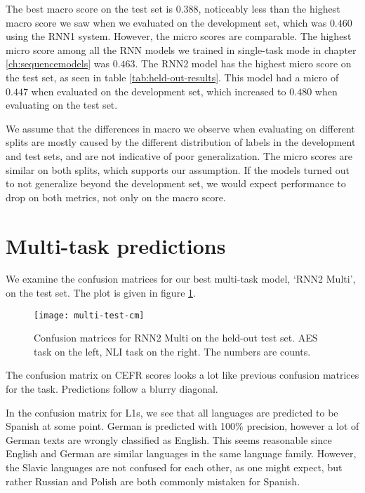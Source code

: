 The best macro \FI score on the test set is $0.388$, noticeably less than the
highest macro \FI score we saw when we evaluated on the development set,
which was $0.460$ using the RNN1 system. However, the micro \FI scores are
comparable. The highest micro \FI score among all the RNN models we trained
in single-task mode in chapter \ref{ch:sequencemodels} was $0.463$. The RNN2
model has the highest micro \FI score on the test set, as seen in table
\ref{tab:held-out-results}. This model had a micro \FI of $0.447$ when
evaluated on the development set, which increased to $0.480$ when evaluating
on the test set.

We assume that the differences in macro \FI we observe when evaluating on
different splits are mostly caused by the different distribution of labels in
the development and test sets, and are not indicative of poor generalization.
The micro \FI scores are similar on both splits, which supports our
assumption. If the models turned out to not generalize beyond the development
set, we would expect performance to drop on both metrics, not only on the
macro \FI score.


\section{Multi-task predictions}

We examine the confusion matrices for our best multi-task model, `RNN2 Multi',
on the test set. The plot is given in figure \ref{fig:multi-test-cm}.

\begin{figure}
  \centering
  \texttt{[image: multi-test-cm]}
  
  \caption[Multi-task confusion matrices]{
    Confusion matrices for RNN2 Multi on the held-out test set. \ac{AES} task
    on the left, \ac{NLI} task on the right. The numbers are counts.
  }
  \label{fig:multi-test-cm}
\end{figure}

The confusion matrix on CEFR scores looks a lot like previous confusion matrices
for the task. Predictions follow a blurry diagonal.

In the confusion matrix for \acp{L1}, we see that all languages are predicted
to be Spanish at some point. German is predicted with 100\% precision,
however a lot of German texts are wrongly classified as English. This seems
reasonable since English and German are similar languages in the same
language family. However, the Slavic languages are not confused for each
other, as one might expect, but rather Russian and Polish are both commonly
mistaken for Spanish.


